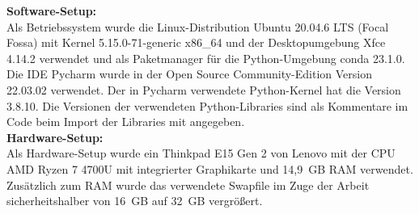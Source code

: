 		\textbf{Software-Setup:}\\
		Als Betriebssystem wurde die Linux-Distribution Ubuntu 20.04.6 LTS (Focal Fossa) mit Kernel 5.15.0-71-generic x86\_64 und der Desktopumgebung Xfce 4.14.2 verwendet und als Paketmanager für die Python-Umgebung conda 23.1.0. Die IDE Pycharm wurde in der Open Source Community-Edition Version 22.03.02 verwendet. Der in Pycharm verwendete Python-Kernel hat die Version 3.8.10. Die Versionen der verwendeten Python-Libraries sind als Kommentare im Code beim Import der Libraries mit angegeben.\\

		\textbf{Hardware-Setup:}\\
		Als Hardware-Setup wurde ein Thinkpad E15 Gen 2 von Lenovo mit der CPU AMD Ryzen 7 4700U mit integrierter Graphikarte und 14,9~GB RAM verwendet. Zusätzlich zum RAM wurde das verwendete Swapfile im Zuge der Arbeit sicherheitshalber von 16~GB auf 32~GB vergrößert.\\
			
			
			
		
